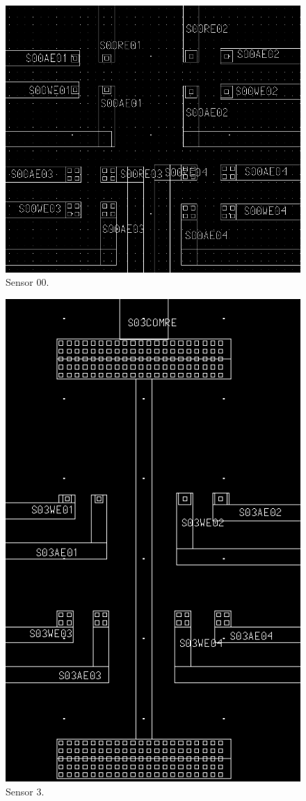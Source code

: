 \begin{figure}
	\centering
	\includegraphics[width=0.7\linewidth]{figures/s00.png}
	\caption{Sensor 00.}
	\label{s00}
\end{figure}

\begin{figure}
	\centering
	\includegraphics[width=0.7\linewidth]{figures/s03.png}
	\caption{Sensor 3.}
	\label{s03}
\end{figure}


